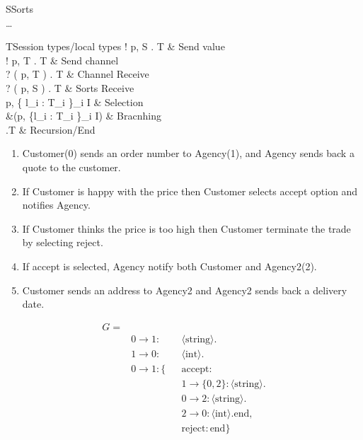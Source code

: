 \begin{table}[ht]
\begin{grammar}{S\Coloneqq}{Sorts}
   \mid {} \mid {} \\
  \dots\\
\end{grammar}
\hfill
\begin{grammar}{T\Coloneqq}{Session types/local types}
  ! \langle p, S \rangle . T & Send value\\
  ! \langle p, T \rangle . T & Send channel\\
  ? ( p, T ) . T & Channel Receive\\
  ? ( p, S ) . T & Sorts Receive\\
  \oplus \langle p, \{ l_i : T_i \}_{i \in I} \rangle & Selection \\
  \&(p, \{l_i : T_i \}_{i \in I}) & Bracnhing \\
  \mu {}.T  \mid {} \mid {} & Recursion/End
\end{grammar}
\caption{Session types/local types} \label{b:mpst:lt}
\end{table}
\begin{table}[ht]
  \begin{minipage}{0.45\textwidth}
    \begin{enumerate}
      \item Customer(0) sends an order number to Agency(1), and Agency sends back a quote to the customer.
      \item If Customer is happy with the price then Customer selects accept option and notifies Agency.
      \item If Customer thinks the price is too high then Customer terminate the trade by selecting reject.
      \item If accept is selected, Agency notify both Customer and Agency2(2). 
      \item Customer sends an address to Agency2 and Agency2 sends back a delivery date.
    \end{enumerate}
  \end{minipage}
  \hfill
  \begin{minipage}{0.45\textwidth}
    \begin{align*}
      G = \\
      & 0 \rightarrow 1: && \langle \text{string} \rangle .\\
      & 1 \rightarrow 0: && \langle \text{int} \rangle .\\
      & 0 \rightarrow 1: \{ && \text{accept}: \\
      & && 1 \rightarrow \{ 0, 2 \}: \langle \text{string} \rangle . \\
      & &&  0 \rightarrow 2: \langle \text{string} \rangle .\\
      & &&  2 \rightarrow 0: \langle \text{int} \rangle . \text{end}, \\
      & && \text{reject}: \text{end} \} \\
    \end{align*}
  \end{minipage}
  \caption{An example of a protocol described by global types G}
  \label{b:mpst:gtex}
\end{table}
